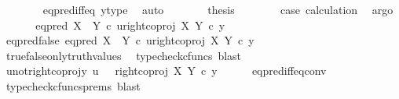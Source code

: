 \begin{isabellebody}
\ \ \ \ \ \ \isamarkupfalse%
\ eq{\isacharunderscore}{\kern0pt}pred{\isacharunderscore}{\kern0pt}iff{\isacharunderscore}{\kern0pt}eq\ y{\isacharunderscore}{\kern0pt}type\ \isamarkupfalse%
\ auto\isanewline
\ \ \ \ \isamarkupfalse%
\ \isamarkupfalse%
\ {\isacharquery}{\kern0pt}thesis\isanewline
\ \ \ \ \ \ \isamarkupfalse%
\ case{}\ calculation\ \isamarkupfalse%
\ argo\isanewline
\ \ \isamarkupfalse%
\isanewline
{}\isamarkupfalse%
\isanewline
\ \ \isamarkupfalse%
\ {\isachardoublequoteopen}eq{\isacharunderscore}{\kern0pt}pred\ {\isacharparenleft}{\kern0pt}X\ {\isasymCoprod}\ Y{\isacharparenright}{\kern0pt}\ {\isasymcirc}\isactrlsub c\ {\isasymlangle}u{\isacharcomma}{\kern0pt}right{\isacharunderscore}{\kern0pt}coproj\ X\ Y\ {\isasymcirc}\isactrlsub c\ y{\isasymrangle}\ {\isasymnoteq}\ {\isasymt}{\isachardoublequoteclose}\isanewline
\ \ \isamarkupfalse%
\ \isamarkupfalse%
\ eq{\isacharunderscore}{\kern0pt}pred{\isacharunderscore}{\kern0pt}false{\isacharcolon}{\kern0pt}\ {\isachardoublequoteopen}eq{\isacharunderscore}{\kern0pt}pred\ {\isacharparenleft}{\kern0pt}X\ {\isasymCoprod}\ Y{\isacharparenright}{\kern0pt}\ {\isasymcirc}\isactrlsub c\ {\isasymlangle}u{\isacharcomma}{\kern0pt}right{\isacharunderscore}{\kern0pt}coproj\ X\ Y\ {\isasymcirc}\isactrlsub c\ y{\isasymrangle}\ {\isacharequal}{\kern0pt}\ {\isasymf}{\isachardoublequoteclose}\isanewline
\ \ \ \ \isamarkupfalse%
\ true{\isacharunderscore}{\kern0pt}false{\isacharunderscore}{\kern0pt}only{\isacharunderscore}{\kern0pt}truth{\isacharunderscore}{\kern0pt}values\ \isamarkupfalse%
\ {\isacharparenleft}{\kern0pt}typecheck{\isacharunderscore}{\kern0pt}cfuncs{\isacharcomma}{\kern0pt}\ blast{\isacharparenright}{\kern0pt}\isanewline
\ \ \isamarkupfalse%
\ \isamarkupfalse%
\ u{\isacharunderscore}{\kern0pt}not{\isacharunderscore}{\kern0pt}right{\isacharunderscore}{\kern0pt}coproj{\isacharunderscore}{\kern0pt}y{\isacharcolon}{\kern0pt}\ {\isachardoublequoteopen}u\ \ {\isasymnoteq}\ right{\isacharunderscore}{\kern0pt}coproj\ X\ Y\ {\isasymcirc}\isactrlsub c\ y{\isachardoublequoteclose}\isanewline
\ \ \ \ \isamarkupfalse%
\ eq{\isacharunderscore}{\kern0pt}pred{\isacharunderscore}{\kern0pt}iff{\isacharunderscore}{\kern0pt}eq{\isacharunderscore}{\kern0pt}conv\ \isamarkupfalse%
\ {\isacharparenleft}{\kern0pt}typecheck{\isacharunderscore}{\kern0pt}cfuncs{\isacharunderscore}{\kern0pt}prems{\isacharcomma}{\kern0pt}\ blast{\isacharparenright}{\kern0pt}\isanewline

\end{isabellebody}
